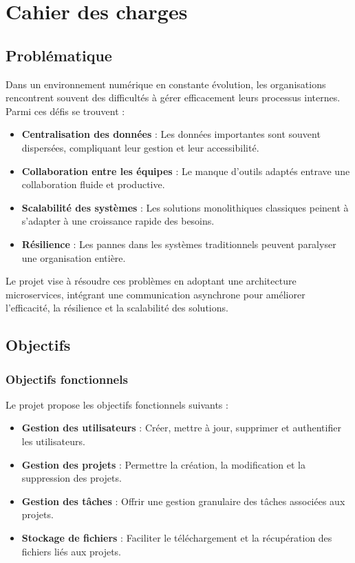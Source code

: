 \documentclass[12pt,a4paper]{report}
\begin{document}
\chapter{Cahier des charges}

\section{Probl\'ematique}
Dans un environnement num\'erique en constante \'evolution, les organisations rencontrent souvent des difficult\'es \`a g\'erer efficacement leurs processus internes. Parmi ces d\'efis se trouvent :
\begin{itemize}
    \item \textbf{Centralisation des donn\'ees} : Les donn\'ees importantes sont souvent dispers\'ees, compliquant leur gestion et leur accessibilit\'e.
    \item \textbf{Collaboration entre les \'equipes} : Le manque d'outils adapt\'es entrave une collaboration fluide et productive.
    \item \textbf{Scalabilit\'e des syst\`emes} : Les solutions monolithiques classiques peinent \`a s'adapter \`a une croissance rapide des besoins.
    \item \textbf{R\'esilience} : Les pannes dans les syst\`emes traditionnels peuvent paralyser une organisation enti\`ere.
\end{itemize}
Le projet vise \`a r\'esoudre ces probl\`emes en adoptant une architecture microservices, int\'egrant une communication asynchrone pour am\'eliorer l'efficacit\'e, la r\'esilience et la scalabilit\'e des solutions.

\section{Objectifs}
\subsection*{Objectifs fonctionnels}
Le projet propose les objectifs fonctionnels suivants :
\begin{itemize}
    \item \textbf{Gestion des utilisateurs} : Cr\'eer, mettre \`a jour, supprimer et authentifier les utilisateurs.
    \item \textbf{Gestion des projets} : Permettre la cr\'eation, la modification et la suppression des projets.
    \item \textbf{Gestion des t\^aches} : Offrir une gestion granulaire des t\^aches associ\'ees aux projets.
    \item \textbf{Stockage de fichiers} : Faciliter le t\'el\'echargement et la r\'ecup\'eration des fichiers li\'es aux projets.
\end{itemize}
\end{document}
